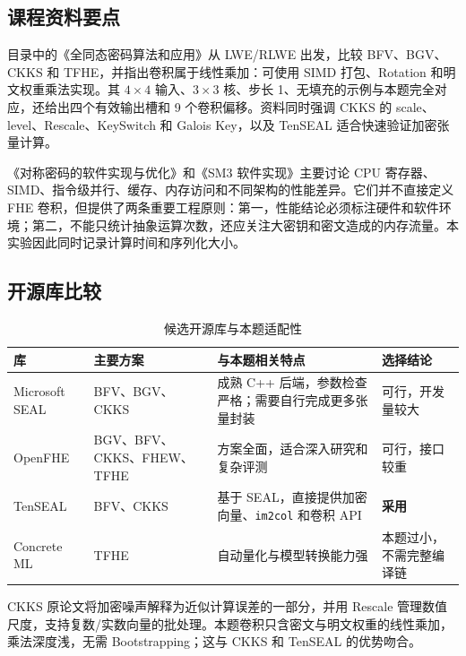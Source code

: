 \documentclass[UTF8,a4paper,zihao=-4]{ctexart}
\begin{document}
\subsection{课程资料要点}

目录中的《全同态密码算法和应用》从 LWE/RLWE 出发，比较 BFV、BGV、CKKS 和 TFHE，并指出卷积属于线性乘加：可使用 SIMD 打包、Rotation 和明文权重乘法实现。其 $4\times4$ 输入、$3\times3$ 核、步长 1、无填充的示例与本题完全对应，还给出四个有效输出槽和 9 个卷积偏移。资料同时强调 CKKS 的 scale、level、Rescale、KeySwitch 和 Galois Key，以及 TenSEAL 适合快速验证加密张量计算\cite{localfhe}。

《对称密码的软件实现与优化》和《SM3 软件实现》主要讨论 CPU 寄存器、SIMD、指令级并行、缓存、内存访问和不同架构的性能差异\cite{localsymmetric,localsm3}。它们并不直接定义 FHE 卷积，但提供了两条重要工程原则：第一，性能结论必须标注硬件和软件环境；第二，不能只统计抽象运算次数，还应关注大密钥和密文造成的内存流量。本实验因此同时记录计算时间和序列化大小。

\subsection{开源库比较}

\begin{table}[H]
\centering
\caption{候选开源库与本题适配性}
\label{tab:library-choice}
\begin{tabularx}{\textwidth}{>{\raggedright\arraybackslash}p{}>{\raggedright\arraybackslash}p{}X >{\raggedright\arraybackslash}p{}}
\toprule
库 & 主要方案 & 与本题相关特点 & 选择结论\\
\midrule
Microsoft SEAL & BFV、BGV、CKKS & 成熟 C++ 后端，参数检查严格；需要自行完成更多张量封装 & 可行，开发量较大\\
OpenFHE & BGV、BFV、CKKS、FHEW、TFHE & 方案全面，适合深入研究和复杂评测 & 可行，接口较重\\
TenSEAL & BFV、CKKS & 基于 SEAL，直接提供加密向量、\texttt{im2col} 和卷积 API\cite{tenseal,tensealconv} & \textbf{采用}\\
Concrete ML & TFHE & 自动量化与模型转换能力强 & 本题过小，不需完整编译链\\
\bottomrule
\end{tabularx}
\end{table}

CKKS 原论文将加密噪声解释为近似计算误差的一部分，并用 Rescale 管理数值尺度，支持复数/实数向量的批处理\cite{ckks}。本题卷积只含密文与明文权重的线性乘加，乘法深度浅，无需 Bootstrapping；这与 CKKS 和 TenSEAL 的优势吻合。
\end{document}

